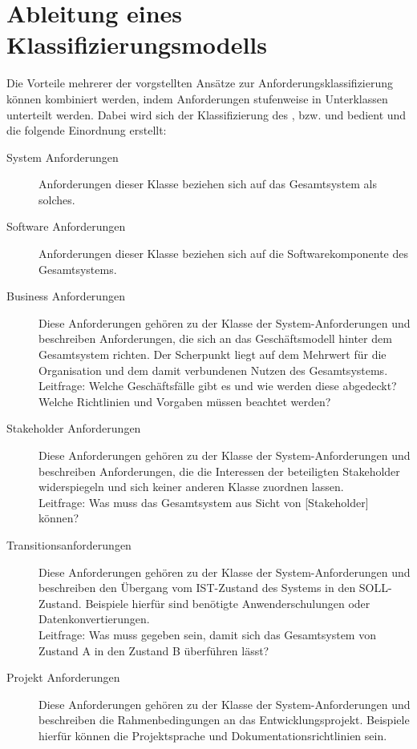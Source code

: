 \section{Ableitung eines Klassifizierungsmodells}
\label{sec:requirements:model}
Die Vorteile mehrerer der vorgstellten Ansätze zur Anforderungsklassifizierung können kombiniert werden, indem Anforderungen stufenweise in Unterklassen unterteilt werden. Dabei wird sich der Klassifizierung des \cite{SWEBOK}, \cite{PMBOK} bzw. \cite{BABOK} und \cite{ISO25010} bedient und die folgende Einordnung erstellt:

\begin{description}
  \item[System Anforderungen] Anforderungen dieser Klasse beziehen sich auf das Gesamtsystem als solches.\\
  \item[Software Anforderungen] Anforderungen dieser Klasse beziehen sich auf die Softwarekomponente des Gesamtsystems.\\
  \item[Business Anforderungen] Diese Anforderungen gehören zu der Klasse der System-Anforderungen und beschreiben Anforderungen, die sich an das Geschäftsmodell hinter dem Gesamtsystem richten. Der Scherpunkt liegt auf dem Mehrwert für die Organisation und dem damit verbundenen Nutzen des Gesamtsystems.\\
  Leitfrage: \glqq Welche Geschäftsfälle gibt es und wie werden diese abgedeckt? Welche Richtlinien und Vorgaben müssen beachtet werden? \grqq
  \item[Stakeholder Anforderungen] Diese Anforderungen gehören zu der Klasse der System-Anforderungen und beschreiben Anforderungen, die die Interessen der beteiligten Stakeholder widerspiegeln und sich keiner anderen Klasse zuordnen lassen.\\
  Leitfrage: \glqq Was muss das Gesamtsystem aus Sicht von [Stakeholder] können? \grqq
  \item[Transitionsanforderungen] Diese Anforderungen gehören zu der Klasse der System-Anforderungen und beschreiben den Übergang vom IST-Zustand des Systems in den SOLL-Zustand. Beispiele hierfür sind benötigte Anwenderschulungen oder Datenkonvertierungen.\\
  Leitfrage: \glqq Was muss gegeben sein, damit sich das Gesamtsystem von Zustand A in den Zustand B überführen lässt? \grqq
  \item[Projekt Anforderungen] Diese Anforderungen gehören zu der Klasse der System-Anforderungen und beschreiben die Rahmenbedingungen an das Entwicklungsprojekt. Beispiele hierfür können die Projektsprache und Dokumentationsrichtlinien sein.\\

\end{description}
